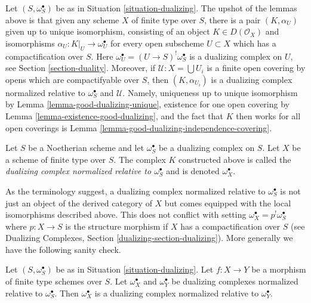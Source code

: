 \noindent
Let $(S, \omega_S^\bullet)$ be as in Situation \ref{situation-dualizing}.
The upshot of the lemmas above is that given any scheme $X$ of finite type
over $S$, there is a pair $(K, \alpha_U)$ given up to unique isomorphism,
consisting of an object $K \in D(\mathcal{O}_X)$ and isomorphisms
$\alpha_U : K|_U \to \omega_U^\bullet$ for every open subscheme
$U \subset X$ which has a compactification over $S$. Here
$\omega_U^\bullet = (U \to S)^!\omega_S^\bullet$ is a dualizing
complex on $U$, see Section \ref{section-duality}. Moreover, if
$\mathcal{U} : X = \bigcup U_i$ is a finite open covering
by opens which are compactifyable over $S$, then
$(K, \alpha_{U_i})$ is a dualizing complex normalized relative to
$\omega_S^\bullet$ and $\mathcal{U}$.
Namely, uniqueness up to unique isomorphism by
Lemma \ref{lemma-good-dualizing-unique},
existence for one open covering by
Lemma \ref{lemma-existence-good-dualizing}, and
the fact that $K$ then works for all open coverings is
Lemma \ref{lemma-good-dualizing-independence-covering}.

\begin{definition}
\label{definition-good-dualizing}
Let $S$ be a Noetherian scheme and let $\omega_S^\bullet$ be a dualizing
complex on $S$. Let $X$ be a scheme of finite type over $S$.
The complex $K$ constructed above is called the
{\it dualizing complex normalized relative to $\omega_S^\bullet$}
and is denoted $\omega_X^\bullet$.
\end{definition}

\noindent
As the terminology suggest, a dualizing complex normalized relative to
$\omega_S^\bullet$ is not just an object of the derived category of $X$
but comes equipped with the local isomorphisms described above.
This does not conflict with setting
$\omega_X^\bullet = p^!\omega_S^\bullet$ where $p : X \to S$ is the
structure morphism if $X$ has a compactification over $S$ (see
Dualizing Complexes, Section \ref{dualizing-section-dualizing}). More generally
we have the following sanity check.

\begin{lemma}
\label{lemma-good-over-both}
Let $(S, \omega_S^\bullet)$ be as in Situation \ref{situation-dualizing}.
Let $f : X \to Y$ be a morphism of finite type schemes over $S$.
Let $\omega_X^\bullet$ and $\omega_Y^\bullet$ be dualizing complexes
normalized relative to $\omega_S^\bullet$. Then $\omega_X^\bullet$
is a dualizing complex normalized relative to $\omega_Y^\bullet$.
\end{lemma}

